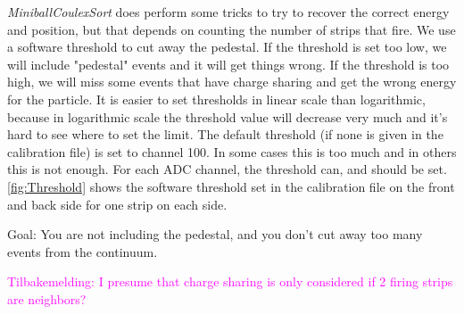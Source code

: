 \documentclass[twoside,english]{uiofysmaster/uiofysmaster}
\begin{document}
\textsl{MiniballCoulexSort} does perform some tricks to try to recover the correct energy and position, but that depends on counting the number of strips that fire. 
We use a software threshold to cut away the pedestal. 
If the threshold is set too low, we will include "pedestal" events and it will get things wrong. 
If the threshold is too high, we will miss some events that have charge sharing and get the wrong energy for the particle. 
It is easier to set thresholds in linear scale than logarithmic, because in logarithmic scale the threshold value will decrease very much and it's hard to see where to set the limit. 
The default threshold (if none is given in the calibration file) is set to channel 100. 
In some cases this is too much and in others this is not enough. 
For each ADC channel, the threshold can, and should be set. 
\autoref{fig:Threshold} shows the software threshold set in the calibration file on the front and back side for one strip on each side.


Goal: You are not including the pedestal, and you don't cut away too many events from the continuum.


\textcolor{Magenta}{Tilbakemelding: \newline 
I presume that charge sharing is only considered if 2 firing strips are neighbors?
}


%
%
%
\end{document}
